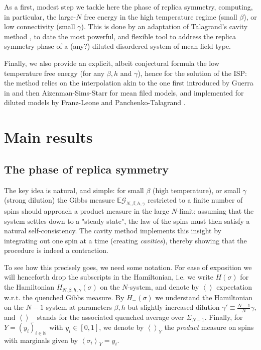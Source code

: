 \documentclass[a4paper,12pt,oneside,reqno]{amsart}
\numberwithin{equation}{section}
\begin{document}
As a first, modest step we tackle here the phase of replica symmetry, computing, in particular, the large-$N$ free energy in the high temperature regime  (small ${\beta}$), or low connectivity (small $\gamma$). This is done by an adaptation of Talagrand's  cavity method \cite{talagrand}, to date the most powerful, and flexible tool to address the replica symmetry phase of a (any?) diluted disordered system of mean field type. 

Finally, we also provide an explicit, albeit conjectural formula the low  temperature free energy (for any ${\beta}, h$ and $\gamma$), hence for the solution of the ISP: the method relies on the interpolation akin to the one first introduced by Guerra in \cite{guerra}  and then  Aizenman-Sims-Starr \cite{ass} for mean filed models, and implemented for diluted models by Franz-Leone \cite{franz} and Panchenko-Talagrand \cite{panchy_tala}.

\section{Main results}

\subsection{The phase of replica symmetry}

The key idea is natural, and simple: for small ${\beta}$ (high temperature), or small $\gamma$ (strong dilution) the Gibbs measure ${{\mathbb{E}}} \mathcal G_{N, {\beta}, h, \gamma}$  restricted to a finite number of spins should approach a product measure in the large $N$-limit; assuming that the system settles down to a "steady state", the law of the spins must then satisfy a natural self-consistency. The cavity method implements this insight by integrating out one spin at a time (creating {\it cavities}), thereby showing that the procedure is indeed a contraction. 

To see how this precisely goes, we need some notation. For ease of exposition we will henceforth drop the subscripts in the Hamiltonian, i.e. we write $H({\sigma})$ for the Hamiltonian $H_{N, {\beta}, h, \gamma}({\sigma})$ on the $N$-system, and denote by $\left < \right>$ expectation w.r.t. the quenched Gibbs measure. By $H_-({\sigma})$ we understand the Hamiltonian on the $N-1$ system at parameters ${\beta}, h$ but slightly increased dilution $\gamma' {\equiv} \frac{N-1}{N} \gamma$, and $\left< \right>_{-}$ stands for the associated quenched average over $\Sigma_{N-1}$. Finally, for $Y = (y_i)_{i\in {\mathbb{N}}}$ with $y_i \in [0,1]$, we denote by $\left< \right>_Y$ the {\it product} measure on spins with marginals given by $\left< {\sigma}_i \right>_Y = y_i$.
\end{document}
